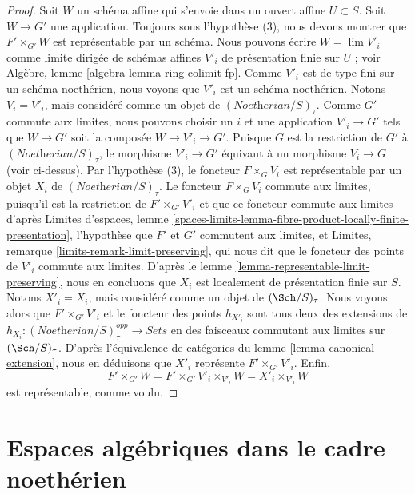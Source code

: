 \begin{proof}
\medskip\noindent
Soit $W$ un schéma affine qui s'envoie dans un ouvert affine $U \subset S$.
Soit $W \to G'$ une application. Toujours sous l'hypothèse (3), nous devons
montrer que $F' \times_{G'} W$ est représentable par un schéma. Nous pouvons
écrire $W = \lim V'_i$ comme limite dirigée de schémas affines $V'_i$ de
présentation finie sur $U$ ; voir Algèbre, lemme
\ref{algebra-lemma-ring-colimit-fp}. Comme $V'_i$ est de type fini sur un
schéma noethérien, nous voyons que $V'_i$ est un schéma noethérien. Notons
$V_i = V'_i$, mais considéré comme un objet de
$(\textit{Noetherian}/S)_\tau$. Comme $G'$ commute aux limites, nous pouvons
choisir un $i$ et une application $V'_i \to G'$ tels que $W \to G'$ soit la
composée $W \to V'_i \to G'$. Puisque $G$ est la restriction de $G'$ à
$(\textit{Noetherian}/S)_\tau$, le morphisme $V'_i \to G'$ équivaut à un
morphisme $V_i \to G$ (voir ci-dessus). Par l'hypothèse (3), le foncteur
$F \times_G V_i$ est représentable par un objet $X_i$ de
$(\textit{Noetherian}/S)_\tau$. Le foncteur $F \times_G V_i$ commute aux
limites, puisqu'il est la restriction de $F' \times_{G'} V'_i$ et que ce
foncteur commute aux limites d'après Limites d'espaces, lemme
\ref{spaces-limits-lemma-fibre-product-locally-finite-presentation},
l'hypothèse que $F'$ et $G'$ commutent aux limites, et Limites, remarque
\ref{limits-remark-limit-preserving}, qui nous dit que le foncteur des points
de $V'_i$ commute aux limites. D'après le lemme
\ref{lemma-representable-limit-preserving}, nous en concluons que $X_i$ est
localement de présentation finie sur $S$. Notons $X'_i = X_i$, mais considéré
comme un objet de $(\Sch/S)_\tau$. Nous voyons alors que
$F' \times_{G'} V'_i$ et le foncteur des points $h_{X'_i}$ sont tous deux des
extensions de
$h_{X_i} : (\textit{Noetherian}/S)_\tau^{opp} \to \textit{Sets}$
en des faisceaux commutant aux limites sur $(\Sch/S)_\tau$. D'après
l'équivalence de catégories du lemme \ref{lemma-canonical-extension}, nous
en déduisons que $X'_i$ représente $F' \times_{G'} V'_i$. Enfin,
$$
F' \times_{G'} W = F' \times_{G'} V'_i \times_{V'_i} W =
X'_i \times_{V'_i} W
$$
est représentable, comme voulu.
\end{proof}






\section{Espaces algébriques dans le cadre noethérien}
\label{section-algebraic-spaces-noetherian}

